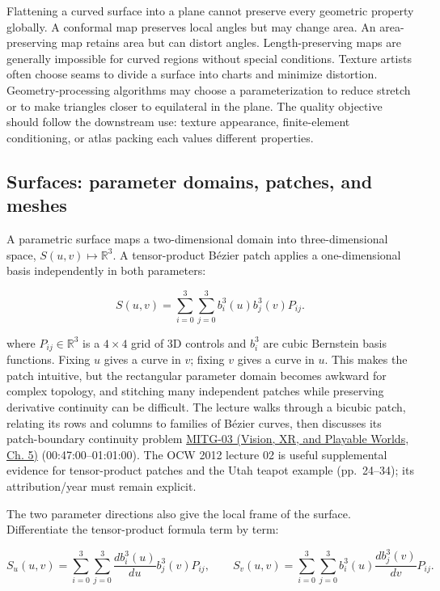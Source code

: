 Flattening a curved surface into a plane cannot preserve every geometric property globally. A conformal map preserves local angles but may change area. An area-preserving map retains area but can distort angles. Length-preserving maps are generally impossible for curved regions without special conditions. Texture artists often choose seams to divide a surface into charts and minimize distortion. Geometry-processing algorithms may choose a parameterization to reduce stretch or to make triangles closer to equilateral in the plane. The quality objective should follow the downstream use: texture appearance, finite-element conditioning, or atlas packing each values different properties.

\subsection{Surfaces: parameter domains, patches, and meshes}\label{03-visual-computing-i-ch002-surfaces-parameter-domains-patches-and-meshes}

A parametric surface maps a two-dimensional domain into three-dimensional space, \(S(u,v)\mapsto\mathbb R^3\). A tensor-product Bézier patch applies a one-dimensional basis independently in both parameters:

\[
S(u,v)=\sum_{i=0}^{3}\sum_{j=0}^{3} b_i^3(u)b_j^3(v)P_{ij}.
\]

where \(P_{ij}\in\mathbb{R}^3\) is a \(4\times4\) grid of 3D controls and \(b_i^3\) are cubic Bernstein basis functions. Fixing \(u\) gives a curve in \(v\); fixing \(v\) gives a curve in \(u\). This makes the patch intuitive, but the rectangular parameter domain becomes awkward for complex topology, and stitching many independent patches while preserving derivative continuity can be difficult. The lecture walks through a bicubic patch, relating its rows and columns to families of Bézier curves, then discusses its patch-boundary continuity problem \href{../07-Vision-XR-and-Playable-Worlds/main.pdf\#nameddest=04-visual-computing-ii-ch036-mitg-03---curves-and-surfaces}{MITG-03 (Vision, XR, and Playable Worlds, Ch. 5)} (00:47:00--01:01:00). The OCW 2012 lecture 02 is useful supplemental evidence for tensor-product patches and the Utah teapot example (pp.~24--34); its attribution/year must remain explicit.

The two parameter directions also give the local frame of the surface. Differentiate the tensor-product formula term by term:

\[
S_u(u,v)=\sum_{i=0}^{3}\sum_{j=0}^{3}\frac{d b_i^3(u)}{du}b_j^3(v)P_{ij},\qquad
S_v(u,v)=\sum_{i=0}^{3}\sum_{j=0}^{3}b_i^3(u)\frac{d b_j^3(v)}{dv}P_{ij}.
\]

